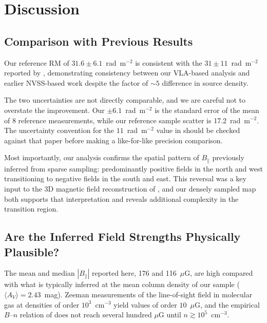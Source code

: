 \documentclass[twocolumn]{aastex701}
\begin{document}
\section{Discussion}
\label{sec:discussion}

\subsection{Comparison with Previous Results}
\label{sec:comparison}

Our reference RM of $31.6 \pm 6.1$~rad~m$^{-2}$ is consistent with the
$31 \pm 11$~rad~m$^{-2}$ reported by \citet{tahani2018}, demonstrating
consistency between our VLA-based analysis and earlier NVSS-based work
despite the factor of $\sim 5$ difference in source density.

The two uncertainties are not directly comparable, and we are careful not to
overstate the improvement. Our $\pm 6.1$~rad~m$^{-2}$ is the standard error of
the mean of 8 reference measurements, while our reference sample scatter is
17.2~rad~m$^{-2}$. The uncertainty convention for the $11$~rad~m$^{-2}$
value in \citet{tahani2018} should be checked against that paper before making
a like-for-like precision comparison.

Most importantly, our analysis confirms the spatial pattern of $B_\parallel$
previously inferred from sparse sampling: predominantly positive fields in the
north and west transitioning to negative fields in the south and east. This
reversal was a key input to the 3D magnetic field reconstruction of
\citet{tahani2022b}, and our densely sampled map both supports that
interpretation and reveals additional complexity in the transition region.

\subsection{Are the Inferred Field Strengths Physically Plausible?}
\label{sec:plausibility}

The mean and median $|B_\parallel|$ reported here, 176 and 116~$\mu$G, are
high compared with what is typically inferred at the mean column density of
our sample ($\langle A_V \rangle = 2.43$~mag). Zeeman measurements of the
line-of-sight field in molecular gas at densities of order
$10^3$~cm$^{-3}$ yield values of order $10$~$\mu$G, and the empirical
$B$--$n$ relation of \citet{crutcher2010magnetic} does not reach several
hundred $\mu$G until $n \gtrsim 10^5$~cm$^{-3}$.
\end{document}
